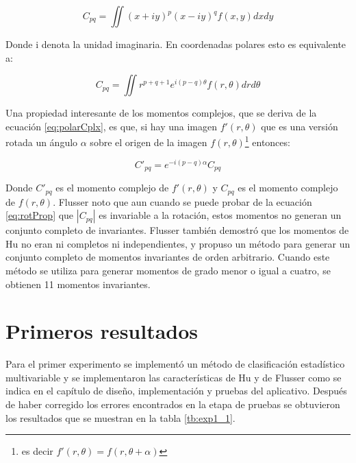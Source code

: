 \documentclass[a4paper, 11pt, oneside]{report}
\begin{document}
	\[ C_{pq} = \iint{ (x+iy)^p (x-iy)^q f(x,y) dx dy } \]
	
Donde i denota la unidad imaginaria. En coordenadas polares esto es equivalente a:

	\begin{equation}\label{eq:polarCplx}
		C_{pq} = \iint{ r^{p+q+1}e^{i(p-q)\theta}f(r,\theta) dr d\theta }
	\end{equation}

Una propiedad interesante de los momentos complejos, que se deriva de la ecuación \ref{eq:polarCplx}, es que, si hay una imagen $f'(r,\theta)$ que es una versión rotada un ángulo $\alpha$ sobre el origen de la imagen $f(r,\theta)$\footnote{es decir $f'(r,\theta) = f(r,\theta+\alpha)$} entonces:

\begin{equation}\label{eq:rotProp}
	C'_{pq} = e^{-i(p-q)\alpha}C_{pq}
\end{equation}

Donde $C'_{pq}$ es el momento complejo de $f'(r,\theta)$ y $C_{pq}$ es el momento complejo de $f(r,\theta)$. Flusser noto\cite{flusser99} que aun cuando se puede probar de la ecuación \ref{eq:rotProp} que $|C_{pq}|$ es invariable a la rotación, estos momentos no generan un conjunto completo de invariantes. Flusser también demostró que los momentos de Hu no eran ni completos ni independientes, y propuso un método para generar un conjunto completo de momentos invariantes de orden arbitrario. Cuando este método se utiliza para generar momentos de grado menor o igual a cuatro, se obtienen 11 momentos invariantes.

\section{Primeros resultados}
\label{sect:exp}

Para el primer experimento se implementó un método de clasificación estadístico multivariable y se implementaron las características de Hu y de Flusser como se indica en el capítulo de diseño, implementación y pruebas del aplicativo. Después de haber corregido los errores encontrados en la etapa de pruebas se obtuvieron los resultados que se muestran en la tabla \ref{tb:exp1_1}.
\end{document}
